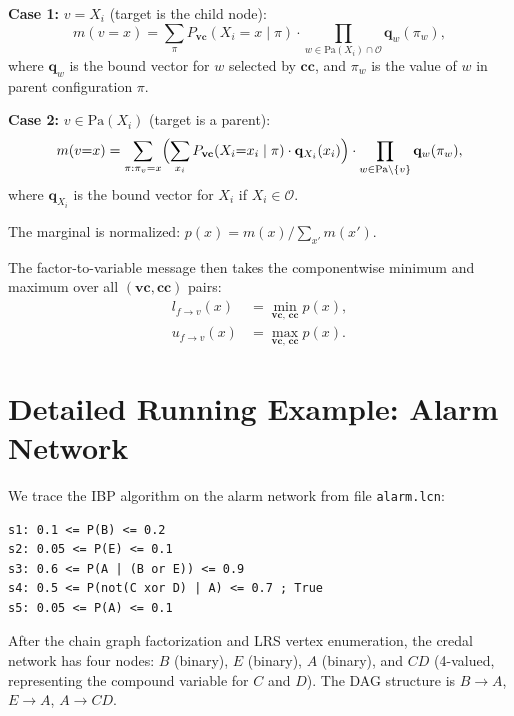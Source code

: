 \documentclass[11pt]{article}
\begin{document}
\medskip
\noindent\textbf{Case 1:} $v = X_i$ (target is the child node):
\begin{equation}\label{eq:case1}
  m(v{=}x) = \sum_{\pi} P_{\mathbf{vc}}(X_i{=}x \mid \pi)
  \cdot \prod_{w \in \mathrm{Pa}(X_i) \cap \mathcal{O}} \mathbf{q}_w(\pi_w),
\end{equation}
where $\mathbf{q}_w$ is the bound vector for $w$ selected by $\mathbf{cc}$, and
$\pi_w$ is the value of $w$ in parent configuration $\pi$.

\medskip
\noindent\textbf{Case 2:} $v \in \mathrm{Pa}(X_i)$ (target is a parent):
\begin{equation}\label{eq:case2}
  m(v{=}x) = \sum_{\pi : \pi_v = x}
  \Bigl(\sum_{x_i} P_{\mathbf{vc}}(X_i{=}x_i \mid \pi) \cdot \mathbf{q}_{X_i}(x_i)\Bigr)
  \cdot \prod_{w \in \mathrm{Pa} \setminus \{v\}} \mathbf{q}_w(\pi_w),
\end{equation}
where $\mathbf{q}_{X_i}$ is the bound vector for $X_i$ if $X_i \in \mathcal{O}$.

\medskip
The marginal is normalized: $p(x) = m(x) / \sum_{x'} m(x')$.

The factor-to-variable message then takes the componentwise minimum and maximum
over all $(\mathbf{vc}, \mathbf{cc})$ pairs:
\begin{align*}
  l_{f \to v}(x) &= \min_{\mathbf{vc},\,\mathbf{cc}} p(x), \\
  u_{f \to v}(x) &= \max_{\mathbf{vc},\,\mathbf{cc}} p(x).
\end{align*}

\section{Detailed Running Example: Alarm Network}

We trace the IBP algorithm on the alarm network from file \texttt{alarm.lcn}:
\begin{verbatim}
s1: 0.1 <= P(B) <= 0.2
s2: 0.05 <= P(E) <= 0.1
s3: 0.6 <= P(A | (B or E)) <= 0.9
s4: 0.5 <= P(not(C xor D) | A) <= 0.7 ; True
s5: 0.05 <= P(A) <= 0.1
\end{verbatim}

After the chain graph factorization and LRS vertex enumeration, the credal network has
four nodes: $B$ (binary), $E$ (binary), $A$ (binary), and $CD$ (4-valued, representing
the compound variable for $C$ and $D$). The DAG structure is $B \to A$, $E \to A$,
$A \to CD$.
\end{document}
